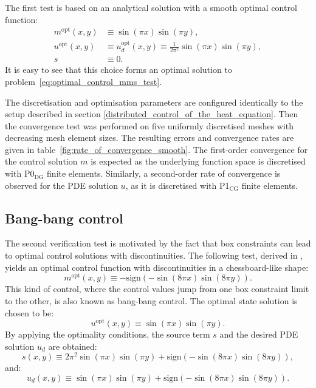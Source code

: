 \documentclass[prodmode,acmtoms]{acmsmall}
\newcommand{\ponecg}{\mbox{P1$_\textrm{CG}$}\xspace}
\newcommand{\pzerodg}{\mbox{P0$_\textrm{DG}$}\xspace}
\begin{document}
The first test is based on an analytical solution with a smooth optimal control function:
\begin{equation*}
 \begin{aligned}
  m^{\mathrm{opt}}(x, y) & \equiv \sin\left(\pi x\right) \sin\left(\pi y\right), \\
u^{\mathrm{opt}}(x, y) & \equiv u_d^{\mathrm{opt}}(x, y) \equiv \frac{1}{2\pi^2}\sin(\pi x) \sin(\pi y), \\
                       s & \equiv 0.
 \end{aligned}
\end{equation*}
It is easy to see that this choice forms an optimal solution to problem~\eqref{eq:optimal_control_mms_test}.

The discretisation and optimisation parameters are configured identically to the setup described in section \ref{distributed_control_of_the_heat_equation}. 
Then the convergence test was performed on five uniformly discretised meshes with decreasing mesh element sizes.
The resulting errors and convergence rates are given in table~\ref{fig:rate_of_convergence_smooth}.
The first-order convergence for the control solution $m$ is expected as the underlying function space is discretised with \pzerodg finite elements. 
Similarly, a second-order rate of convergence is observed  for the PDE solution $u$, as it is discretised with \ponecg finite elements. 


\subsection{Bang-bang control}
The second verification test is motivated by the fact that box constraints can lead to optimal control solutions with discontinuities.
The following test, derived in , yields an optimal control function with discontinuities in a chessboard-like shape:
\begin{equation*}
m^{\mathrm{opt}}(x, y) \equiv - \mathrm{sign} \left(-\sin\left(8\pi x\right)\sin\left(8\pi y\right)\right).
\end{equation*}
This kind of control, where the control values jump from one box constraint limit to the other, is also known as bang-bang control.
The optimal state solution is chosen to be:
\begin{equation*}
u^{\mathrm{opt}}(x, y) \equiv \sin(\pi x) \sin(\pi y).
\end{equation*}
By applying the optimality conditions, the source term $s$ and the desired PDE solution $u_d$ are obtained:
\begin{equation*}
s(x, y) \equiv 2 \pi^2 \sin(\pi x)\sin(\pi y) + \mathrm{sign}\left(-\sin\left(8\pi x\right)\sin\left(8\pi y\right)\right),
\end{equation*}
and:
\begin{equation*}
u_d(x, y) \equiv \sin(\pi x)\sin(\pi y) + \mathrm{sign}\left(-\sin\left(8\pi x\right)\sin\left(8\pi y\right)\right).
\end{equation*}
\end{document}
